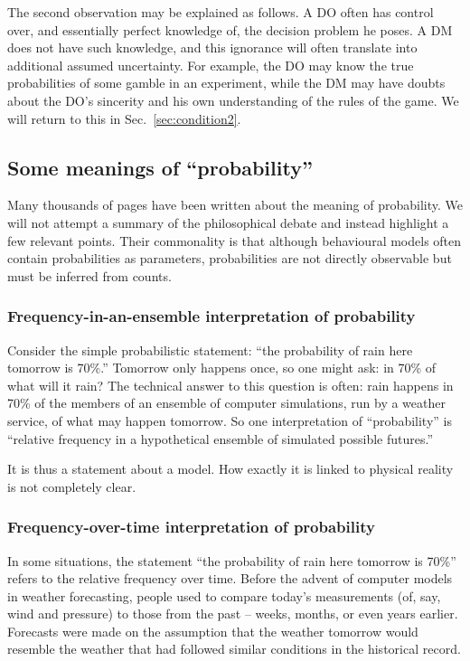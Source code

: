 \documentclass[a4paper, 12pt]{article}
\newcommand{\seclabel}[1]{\label{sec:#1}}
\newcommand{\secref}[1]{Sec.~\ref{sec:#1}}
\begin{document}
The second observation may be explained as follows. A DO often has control over, and essentially perfect knowledge of, the decision problem he poses. A DM does not have such knowledge, and this ignorance will often translate into additional assumed uncertainty. For example, the DO may know the true probabilities of some gamble in an experiment, while the DM may have doubts about the DO's sincerity and his own understanding of the rules of the game. We will return to this in \secref{condition2}.

\subsection{Some meanings of ``probability'' \seclabel{tricky}}
Many thousands of pages have been written about the meaning of probability. We will not attempt a summary of the philosophical debate and instead highlight a few relevant points. Their commonality is that although behavioural models often contain probabilities as parameters, probabilities are not directly observable but must be inferred from counts.

\subsubsection*{Frequency-in-an-ensemble interpretation of probability}
Consider the simple probabilistic statement: ``the probability of rain here tomorrow is 70\%.'' Tomorrow only happens once, so one might ask: in 70\% of what will it rain? The technical answer to this question is often: rain happens in 70\% of the members of an ensemble of computer simulations, run by a weather service, of what may happen tomorrow. So one interpretation of ``probability'' is ``relative frequency in a hypothetical ensemble of simulated possible futures.''

It is thus a statement about a model. How exactly it is linked to physical reality is not completely clear.

\subsubsection*{Frequency-over-time interpretation of probability}
In some situations, the statement ``the probability of rain here tomorrow is 70\%'' refers to the relative frequency over time. Before the advent of computer models in weather forecasting, people used to compare today's measurements (of, say, wind and pressure) to those from the past -- weeks, months, or even years earlier. Forecasts were made on the assumption that the weather tomorrow would resemble the weather that had followed similar conditions in the historical record.
\end{document}
